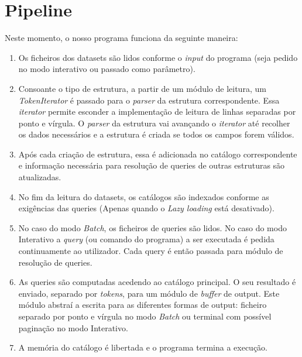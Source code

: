 \documentclass{article}
\begin{document}
    \section{Pipeline}
        Neste momento, o nosso programa funciona da seguinte maneira:
        \begin{enumerate}[\bfseries 1.]
            \item Os ficheiros dos datasets são lidos conforme o \textit{input}
            do programa (seja pedido no modo interativo ou passado como parâmetro).
            
            \item Consoante o tipo de estrutura, a partir de um módulo de leitura,
            um \textit{TokenIterator} é passado para o \textit{parser}
            da estrutura correspondente. Essa \textit{iterator} permite esconder
            a implementação de leitura de linhas separadas por ponto e vírgula. 
            O \textit{parser} da estrutura vai avançando o \textit{iterator}
            até recolher os dados necessários e a estrutura é criada se todos os campos forem válidos.
                        
            \item Após cada criação de estrutura, essa é adicionada no catálogo correspondente
            e informação necessária para resolução de queries de outras estruturas
            são atualizadas.
            
            \item No fim da leitura do datasets, os catálogos são indexados
            conforme as exigências das queries (Apenas quando o \textit{Lazy loading} está desativado). 
        
            \item No caso do modo \textit{Batch}, os ficheiros de queries são lidos. No caso
            do modo Interativo a \textit{query} (ou comando do programa) a ser executada é pedida continuamente ao utilizador.
            Cada query é então passada para módulo de resolução de queries. 
            
            \item As queries são computadas acedendo ao catálogo principal.
            O seu resultado é enviado, separado por \textit{tokens}, para um módulo de \textit{buffer} de output.
            Este módulo abstraí a escrita para as diferentes formas de output: ficheiro separado por ponto e vírgula no
            modo \textit{Batch} ou terminal com possível paginação no modo Interativo.
            
            \item A memória do catálogo é libertada e o programa termina a execução.
            
        \end{enumerate}
        
\end{document}
